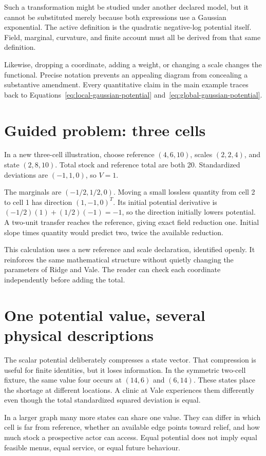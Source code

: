 Such a transformation might be studied under another declared model, but it cannot be substituted merely because both expressions use a Gaussian exponential. The active definition is the quadratic negative-log potential itself. Field, marginal, curvature, and finite account must all be derived from that same definition.

Likewise, dropping a coordinate, adding a weight, or changing a scale changes the functional. Precise notation prevents an appealing diagram from concealing a substantive amendment. Every quantitative claim in the main example traces back to Equations~\ref{eq:local-gaussian-potential} and~\ref{eq:global-gaussian-potential}.

\section{Guided problem: three cells}
In a new three-cell illustration, choose reference \((4,6,10)\), scales \((2,2,4)\), and state \((2,8,10)\). Total stock and reference total are both 20. Standardized deviations are \((-1,1,0)\), so \(V=1\).

The marginals are \((-1/2,1/2,0)\). Moving a small lossless quantity from cell 2 to cell 1 has direction \((1,-1,0)^T\). Its initial potential derivative is \((-1/2)(1)+(1/2)(-1)=-1\), so the direction initially lowers potential. A two-unit transfer reaches the reference, giving exact field reduction one. Initial slope times quantity would predict two, twice the available reduction.

This calculation uses a new reference and scale declaration, identified openly. It reinforces the same mathematical structure without quietly changing the parameters of Ridge and Vale. The reader can check each coordinate independently before adding the total.

\section{One potential value, several physical descriptions}
The scalar potential deliberately compresses a state vector. That compression is useful for finite identities, but it loses information. In the symmetric two-cell fixture, the same value four occurs at \((14,6)\) and \((6,14)\). These states place the shortage at different locations. A clinic at Vale experiences them differently even though the total standardized squared deviation is equal.

In a larger graph many more states can share one value. They can differ in which cell is far from reference, whether an available edge points toward relief, and how much stock a prospective actor can access. Equal potential does not imply equal feasible menus, equal service, or equal future behaviour.

